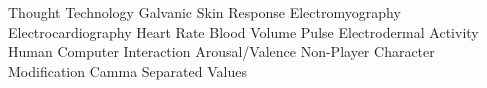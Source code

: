    {Thought Technology}
  {Galvanic Skin Response}
  {Electromyography}
  {Electrocardiography}
   {Heart Rate}
  {Blood Volume Pulse}
  {Electrodermal Activity}
  {Human Computer Interaction}
   {Arousal/Valence}
  {Non-Player Character}
  {Modification}
  {Camma Separated Values}
